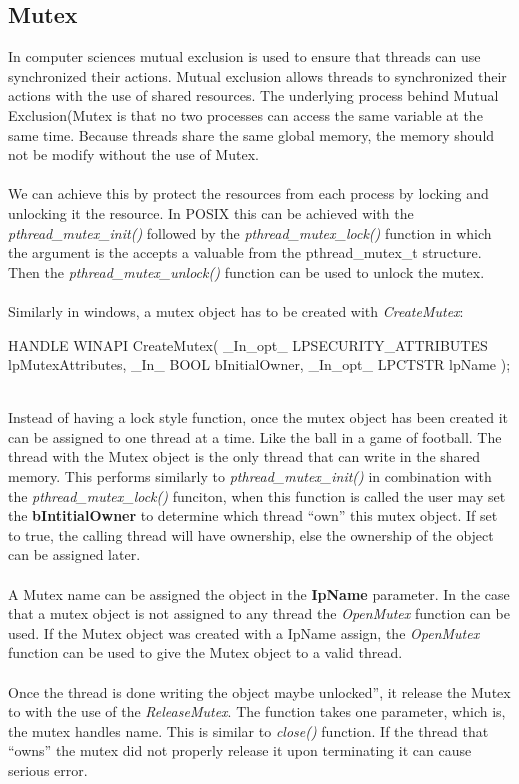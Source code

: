 \documentclass[a4paper]{article}
\begin{document}
\subsection{Mutex}
In computer sciences mutual exclusion is used to ensure that threads can use synchronized their actions. Mutual exclusion allows threads to synchronized their actions with the use of shared resources. The underlying process behind Mutual Exclusion(Mutex is that no two processes can access the same variable at the same time. Because threads share the same global memory, the memory should not be modify without the use of Mutex. \\
\\
We can achieve this by protect the resources from each process by locking and unlocking it the resource.  In POSIX this can be achieved with the \textit{ pthread\_mutex\_init()} followed by the \textit{ pthread\_mutex\_lock()} function in which the argument is the accepts a valuable from the pthread\_mutex\_t structure. Then the \textit{pthread\_mutex\_unlock()} function can be used to unlock the mutex. \\
\\
Similarly in windows, a mutex object has to be created with \textit{CreateMutex}:\\
\begin{code}

HANDLE WINAPI CreateMutex(
 	_In_opt_  LPSECURITY_ATTRIBUTES lpMutexAttributes,
 	_In_      BOOL bInitialOwner,
 	_In_opt_  LPCTSTR lpName
);

\end{code}\\
Instead of having a lock style function, once the mutex object has been created it can be assigned to one thread at a time. Like the ball in a game of football. The thread with the Mutex object is the only thread that can write in the shared memory. This performs similarly to \textit{pthread\_mutex\_init()} in combination with the \textit{pthread\_mutex\_lock()} funciton, when this function is called the user may set the \textbf{bIntitialOwner} to determine which thread “own” this mutex object. If set to true, the calling thread will have ownership, else the ownership of the object can be assigned later.  \\
\\
A Mutex name can be assigned the object in the \textbf{IpName} parameter.  In the case that a mutex object is not assigned to any thread the \textit{OpenMutex} function can be used. If the Mutex object was created with a IpName assign, the \textit{OpenMutex} function can be used to give the Mutex object to a valid thread. \\
\\
Once the thread is done writing the object maybe unlocked”, it release the Mutex to with the use of the \textit{ReleaseMutex}. The function takes one parameter, which is, the mutex handles name. This is similar to \textit{close()} function. If the thread that “owns” the mutex did not properly release it upon terminating it can cause serious error.
\end{document}
